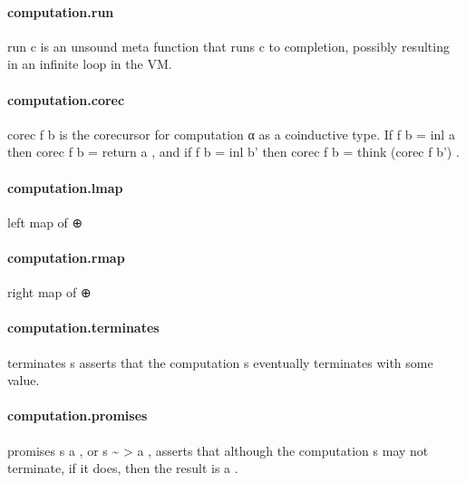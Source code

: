 \documentclass{article}
\begin{document}
\paragraph{computation.run}
\par
\colorbox[RGB]{253,246,227}{{{{\color[RGB]{101, 123, 131} run c }}}} is an unsound meta function that runs 
\colorbox[RGB]{253,246,227}{{{{\color[RGB]{101, 123, 131} c }}}} to completion, possibly
resulting in an infinite loop in the VM.
\paragraph{computation.corec}
\par
\colorbox[RGB]{253,246,227}{{{{\color[RGB]{101, 123, 131} corec f b }}}} is the corecursor for 
\colorbox[RGB]{253,246,227}{{{{\color[RGB]{101, 123, 131} computation α }}}} as a coinductive type.
If 
\colorbox[RGB]{253,246,227}{{{{\color[RGB]{101, 123, 131} f b  }}}{{{\color[RGB]{181, 137, 0} = }}}{{{\color[RGB]{101, 123, 131}  inl a }}}} then 
\colorbox[RGB]{253,246,227}{{{{\color[RGB]{101, 123, 131} corec f b  }}}{{{\color[RGB]{181, 137, 0} = }}}{{{\color[RGB]{101, 123, 131}  return a }}}}, and if 
\colorbox[RGB]{253,246,227}{{{{\color[RGB]{101, 123, 131} f b  }}}{{{\color[RGB]{181, 137, 0} = }}}{{{\color[RGB]{101, 123, 131}  inl b' }}}} then
\colorbox[RGB]{253,246,227}{{{{\color[RGB]{101, 123, 131} corec f b  }}}{{{\color[RGB]{181, 137, 0} = }}}{{{\color[RGB]{101, 123, 131}  think (corec f b') }}}}.
\paragraph{computation.lmap}
\par
left map of 
\colorbox[RGB]{253,246,227}{{{{\color[RGB]{101, 123, 131} ⊕ }}}}\paragraph{computation.rmap}
\par
right map of 
\colorbox[RGB]{253,246,227}{{{{\color[RGB]{101, 123, 131} ⊕ }}}}\paragraph{computation.terminates}
\par
\colorbox[RGB]{253,246,227}{{{{\color[RGB]{101, 123, 131} terminates s }}}} asserts that the computation 
\colorbox[RGB]{253,246,227}{{{{\color[RGB]{101, 123, 131} s }}}} eventually terminates with some value.
\paragraph{computation.promises}
\par
\colorbox[RGB]{253,246,227}{{{{\color[RGB]{101, 123, 131} promises s a }}}}, or 
\colorbox[RGB]{253,246,227}{{{{\color[RGB]{101, 123, 131} s \textasciitilde{} }}}{{{\color[RGB]{181, 137, 0} > }}}{{{\color[RGB]{101, 123, 131}  a }}}}, asserts that although the computation 
\colorbox[RGB]{253,246,227}{{{{\color[RGB]{101, 123, 131} s }}}}may not terminate, if it does, then the result is 
\colorbox[RGB]{253,246,227}{{{{\color[RGB]{101, 123, 131} a }}}}.
\end{document}

